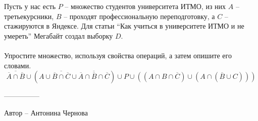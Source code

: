 \question
Пусть у нас есть $P$ -- множество студентов университета ИТМО, из них $A$ -- третьекурсники, $B$ -- проходят профессиональную переподготовку, а $C$ -- стажируются в Яндексе. Для статьи “Как учиться в университете ИТМО и не умереть” Мегабайт создал выборку $D$.
\\
\\
Упростите множество, используя свойства операций, а затем опишите его словами.
\begin{equation*}
    \overline{\overline{A} \cap \overline{B}} \cup (A \cup \overline{\overline{B} \cap \overline{C}} \cup \overline{\overline{A} \cap \overline{B} \cap \overline{C}}) \cup P\cup ((A\cap B\cap \overline{C})\cup (A \cap (\overline{B}\cup C)))
\end{equation*}

---------------

Автор -- Антонина Чернова